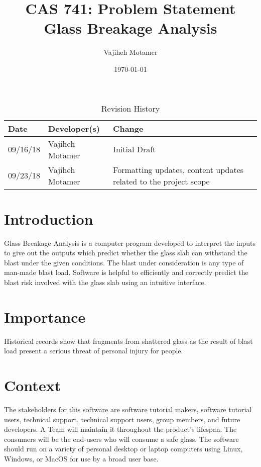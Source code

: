 \documentclass[12pt,letterpaper]{article}
\title{CAS 741: Problem Statement\\Glass Breakage Analysis}
\author{Vajiheh Motamer} \date{\today}
\begin{document}
\maketitle

\begin{table}[hp] \caption{Revision History} \label{TblRevisionHistory}
\begin{tabularx}{\textwidth}{llX} 
\toprule 
\textbf{Date} & \textbf{Developer(s)} & \textbf{Change}\\ 
\midrule 
09/16/18 & Vajiheh Motamer & Initial Draft\\
09/23/18 & Vajiheh Motamer & Formatting updates, content updates related to the
                             project scope\\ 
\bottomrule 
\end{tabularx} 
\end{table}


\section{Introduction}

Glass Breakage Analysis is a computer program developed to
interpret the inputs to give out the outputs which predict whether the glass
slab can withstand the blast under the given conditions. The blast under
consideration is any type of man-made blast load. Software is helpful to
efficiently and correctly predict the blast risk involved with the glass slab
using an intuitive interface.


\section{Importance} 

Historical records show that fragments from shattered glass
as the result of blast load present a serious threat of personal injury for
people.


\section{Context}

The stakeholders for this software are software tutorial makers, software
tutorial users, technical support, technical support users, group members, and
future developers. A Team will maintain it throughout the product’s lifespan.
The consumers will be the end-users who will consume a safe glass. The software
should run on a variety of personal desktop or laptop computers using Linux,
Windows, or MacOS for use by a broad user base.

\end{document}
